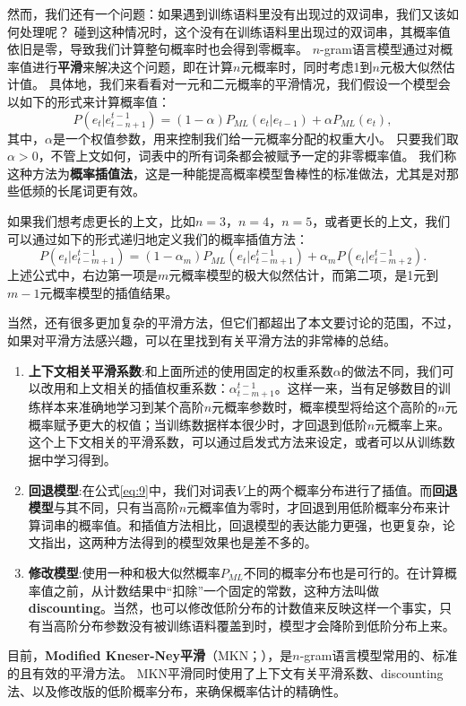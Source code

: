 \documentclass[10pt,a4paper]{ctexart}
\begin{document}
然而，我们还有一个问题：如果遇到训练语料里没有出现过的双词串，我们又该如何处理呢？
碰到这种情况时，这个没有在训练语料里出现过的双词串，其概率值依旧是零，导致我们计算整句概率时也会得到零概率。
$n$-gram语言模型通过对概率值进行\textbf{平滑}来解决这个问题，即在计算$n$元概率时，同时考虑1到$n$元极大似然估计值。
具体地，我们来看看对一元和二元概率的平滑情况，我们假设一个模型会以如下的形式来计算概率值：
\begin{equation}\label{eq:9}
 P(e_t|e_{t-n+1}^{t-1}) = (1 - \alpha)P_{ML}(e_t|e_{t-1}) + \alpha P_{ML}(e_t),
\end{equation}
其中，$\alpha$是一个权值参数，用来控制我们给一元概率分配的权重大小。
只要我们取$\alpha > 0$，不管上文如何，词表中的所有词条都会被赋予一定的非零概率值。
我们称这种方法为\textbf{概率插值法}，这是一种能提高概率模型鲁棒性的标准做法，尤其是对那些低频的长尾词更有效。

如果我们想考虑更长的上文，比如$n=3$，$n=4$，$n=5$，或者更长的上文，我们可以通过如下的形式递归地定义我们的概率插值方法：
\begin{equation}\label{eq:10}
 P(e_t|e_{t-m+1}^{t-1}) = (1 - \alpha_{m})P_{ML}(e_t|e_{t-m+1}^{t-1}) + \alpha_{m}P(e_t|e_{t-m+2}^{t-1}).
\end{equation}
上述公式中，右边第一项是$m$元概率模型的极大似然估计，而第二项，是1元到$m-1$元概率模型的插值结果。

当然，还有很多更加复杂的平滑方法，但它们都超出了本文要讨论的范围，不过，如果对平滑方法感兴趣，可以在\cite{chen1996empirical}里找到有关平滑方法的非常棒的总结。

\begin{enumerate}
\item[] \textbf{上下文相关平滑系数}:和上面所述的使用固定的权重系数$\alpha$的做法不同，我们可以改用和上文相关的插值权重系数：$\alpha_{t-m+1}^{t-1}$。这样一来，当有足够数目的训练样本来准确地学习到某个高阶$n$元概率参数时，概率模型将给这个高阶的$n$元概率赋予更大的权值；当训练数据样本很少时，才回退到低阶$n$元概率上来。这个上下文相关的平滑系数，可以通过启发式方法来设定\cite{witten1991zero}，或者可以从训练数据中学习得到\cite{neubig2016generalizing}。
\item[] \textbf{回退模型}:在公式\ref{eq:9}中，我们对词表$V$上的两个概率分布进行了插值。而\textbf{回退模型}与其不同，只有当高阶$n$元概率值为零时，才回退到用低阶概率分布来计算词串的概率值。和插值方法相比，回退模型的表达能力更强，也更复杂，论文\cite{goodman2001bit}指出，这两种方法得到的模型效果也是差不多的\cite{goodman2001bit}。
\item[] \textbf{修改模型}:使用一种和极大似然概率$P_{ML}$不同的概率分布也是可行的。在计算概率值之前，从计数结果中“扣除”一个固定的常数，这种方法叫做\textbf{discounting}。当然，也可以修改低阶分布的计数值来反映这样一个事实，只有当高阶分布参数没有被训练语料覆盖到时，模型才会降阶到低阶分布上来。
\end{enumerate}
目前，\textbf{Modified Kneser-Ney平滑}（MKN；\cite{chen1996empirical}），是$n$-gram语言模型常用的、标准的且有效的平滑方法。
MKN平滑同时使用了上下文有关平滑系数、discounting法、以及修改版的低阶概率分布，来确保概率估计的精确性。
\end{document}
